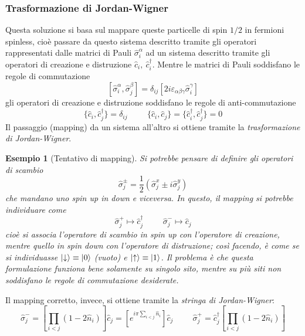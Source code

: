 \documentclass[11pt, a4paper]{scrartcl}
\theoremstyle{style}
\newtheorem{esempio}{Esempio}[section]
\theoremstyle{style1}
\numberwithin{equation}{subsection}
\begin{document}
\subsubsection{Trasformazione di Jordan-Wigner}
Questa soluzione si basa sul mappare queste particelle di spin $1 / 2$ in fermioni spinless, cio\`e passare da questo sistema descritto tramite gli operatori rappresentati dalle matrici di Pauli $\hat{\sigma }_i^{\alpha }$ ad un sistema descritto tramite gli operatori di creazione e distruzione $\hat{c}_i, \ \hat{c}^\dagger _i$.
Mentre le matrici di Pauli soddisfano le regole di commutazione 
\[
	[\hat{\sigma }_i^\alpha , \hat{\sigma }_j ^\beta ] = \delta _{ij} \left[ 2 i \varepsilon _{\alpha  \beta  \gamma} \hat{\sigma }_i^\gamma \right] 
\] 
gli operatori di creazione e distruzione soddisfano le regole di anti-commutazione
\[
	\{\hat{c}_i, \hat{c}_j^\dagger \} = \delta _{ij} \hspace{1cm} \{\hat{c}_i, \hat{c}_j\} = \{\hat{c}_i^\dagger , \hat{c}_j^\dagger \} = 0 
\] 
Il passaggio (mapping) da un sistema all'altro si ottiene tramite la \textit{trasformazione di Jordan-Wigner}.
\begin{esempio}
	[Tentativo di mapping] Si potrebbe pensare di definire gli operatori di scambio 
	\[
	\hat{\sigma }_j ^{\pm} = \frac{1}{2} \left(\hat{\sigma }_j^x \pm i \hat{\sigma }_j^y\right) 
	\] 
	che mandano uno spin up in down e viceversa. 
	In questo, il mapping si potrebbe individuare come 
	\[
	\hat{\sigma }_j^{+}\longmapsto \hat{c}_j^\dagger  \hspace{1cm} \hat{\sigma }_j^- \longmapsto \hat{c}_j
	\] 
cio\`e si associa l'operatore di scambio in spin up con l'operatore di creazione, mentre quello in spin down con l'operatore di distruzione; cos\`i facendo, \`e come se si individuasse $\ket{\downarrow} \equiv \ket{0} $ (vuoto) e $\ket{\uparrow} \equiv \ket{1} $.
Il problema \`e che questa formulazione funziona bene solamente su singolo sito, mentre su pi\`u siti non soddisfano le regole di commutazione desiderate.
\end{esempio}
\noindent Il mapping corretto, invece, si ottiene tramite la \textit{stringa di Jordan-Wigner}:
\begin{equation}
		\hat{\sigma }_j^{-}= \left[ \prod_{i < j} \left(1 - 2 \hat{n}_i\right)  \right] \hat{c}_j = \left[ e^{i \pi \sum_{i<j}^{} \hat{n}_i} \right] \hat{c}_j\hspace{1cm}\hat{\sigma }_j^+ = \hat{c}_j ^\dagger \left[ \prod_{i<j} \left(1-2\hat{n}_i\right)  \right] 
\end{equation}
\end{document}
